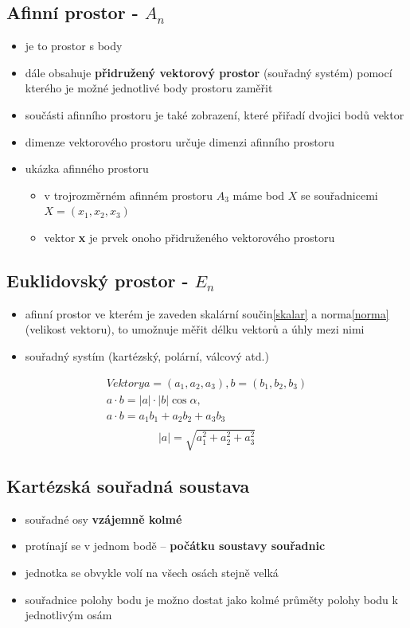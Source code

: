 \subsection{Afinní prostor - $A_n$}
\begin{itemize}
	\item je to prostor s body
	\item dále obsahuje \textbf{přidružený vektorový prostor} (souřadný systém) pomocí kterého je možné jednotlivé body prostoru zaměřit
	\item součásti afinního prostoru je také zobrazení, které přiřadí dvojici bodů vektor
	\item dimenze vektorového prostoru určuje dimenzi afinního prostoru
	\item ukázka afinného prostoru
	\begin{itemize}
		\item v trojrozměrném afinném prostoru $A_3$ máme bod $X$ se souřadnicemi $X=(x_1,x_2,x_3)$
		\item vektor \textbf{x} je prvek onoho přidruženého vektorového prostoru
	\end{itemize}
\end{itemize}


\subsection{Euklidovský prostor - $E_n$}
\begin{itemize}
	\item afinní prostor ve kterém je zaveden skalární součin\eqref{skalar} a norma\eqref{norma} (velikost vektoru), to umožnuje měřit délku vektorů a úhly mezi nimi
	\item souřadný systím (kartézský, polární, válcový atd.)
\end{itemize}
\begin{equation}
\begin{aligned}
\label{skalar}
Vektory  a = (a_1,a_2,a_3),  b = (b_1,b_2,b_3) \\
 a \cdot b = |a| \cdot |b| \cos \alpha, \\
 a \cdot b = a_1b_1 + a_2b_2 +a_3b_3 \\ 
 \end{aligned}
\end{equation}
\begin{equation}
\label{norma}
 |a| = \sqrt{a_1^2 + a_2^2 + a_3^2} 
\end{equation}

\subsection{Kartézská souřadná soustava}
\begin{itemize}
	\item souřadné osy \textbf{vzájemně kolmé}
	\item protínají se v jednom bodě -- \textbf{počátku soustavy souřadnic}
	\item jednotka se obvykle volí na všech osách stejně velká
	\item souřadnice polohy bodu je možno dostat jako kolmé průměty polohy bodu k jednotlivým osám
\end{itemize}

